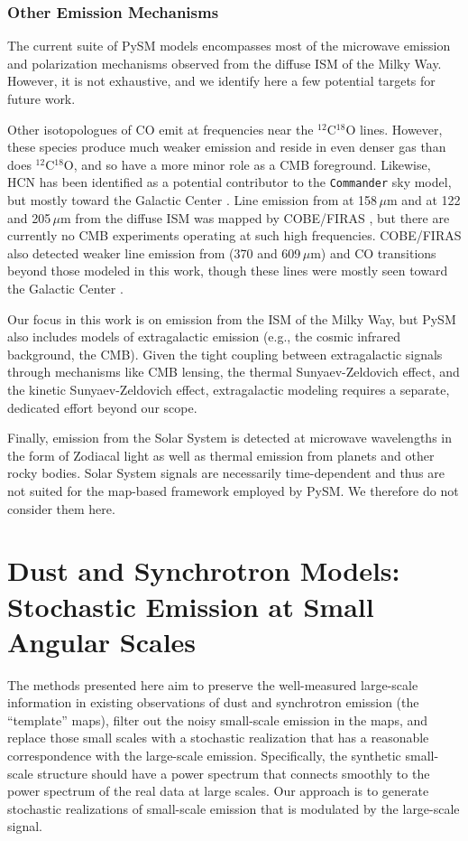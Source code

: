 \documentclass[twocolumn]{aastex631}
\begin{document}
\subsubsection{Other Emission Mechanisms}
The current suite of PySM models encompasses most of the microwave emission and polarization mechanisms observed from the diffuse ISM of the Milky Way. However, it is not exhaustive, and we identify here a few potential targets for future work.

Other isotopologues of CO emit at frequencies near the $^{12}$C$^{18}$O lines. However, these species produce much weaker emission and reside in even denser gas than does $^{12}$C$^{18}$O, and so have a more minor role as a CMB foreground. Likewise, HCN has been identified as a potential contributor to the \texttt{Commander} sky model, but mostly toward the Galactic Center \citep{planck2014-a12}. Line emission from  at 158\,$\mu$m and  at 122 and 205\,$\mu$m from the diffuse ISM was mapped by COBE/FIRAS \citep{Bennett:1994}, but there are currently no CMB experiments operating at such high frequencies. COBE/FIRAS also detected weaker line emission from  (370 and 609\,$\mu$m) and CO transitions beyond those modeled in this work, though these lines were mostly seen toward the Galactic Center \citep{Bennett:1994}. 

Our focus in this work is on emission from the ISM of the Milky Way, but PySM also includes models of extragalactic emission (e.g., the cosmic infrared background, the CMB). Given the tight coupling between extragalactic signals through mechanisms like CMB lensing, the thermal Sunyaev-Zeldovich effect, and the kinetic Sunyaev-Zeldovich effect, extragalactic modeling requires a separate, dedicated effort beyond our scope.

Finally, emission from the Solar System is detected at microwave wavelengths in the form of Zodiacal light as well as thermal emission from planets and other rocky bodies. Solar System signals are necessarily time-dependent and thus are not suited for the map-based framework employed by PySM. We therefore do not consider them here.

\section{Dust and Synchrotron Models: Stochastic Emission at Small Angular Scales} \label{sec:small_scales}
The methods presented here aim to preserve the well-measured large-scale information in existing observations of dust and synchrotron emission (the ``template'' maps), filter out the noisy small-scale emission in the maps, and replace those small scales with a stochastic realization that has a reasonable correspondence with the large-scale emission. Specifically, the synthetic small-scale structure should have a power spectrum that connects smoothly to the power spectrum of the real data at large scales. Our approach is to generate stochastic realizations of small-scale emission that is modulated by the large-scale signal.
\end{document}
